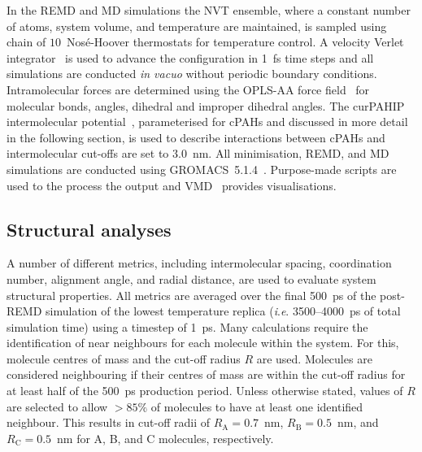 In the REMD and MD simulations the NVT ensemble, where a constant number of atoms, system volume, and temperature are maintained, is sampled using chain of $10$~Nos\'{e}-Hoover thermostats for temperature control. A velocity Verlet integrator~\cite{Verlet_1967} is used to advance the configuration in 1~fs time steps and all simulations are conducted \textit{in vacuo} without periodic boundary conditions.  Intramolecular forces are determined using the OPLS-AA force field~\cite{Kaminski2001opls} for molecular bonds, angles, dihedral and improper dihedral angles. The curPAHIP intermolecular potential~\cite{bowal2019ion}, parameterised for cPAHs and discussed in more detail in the following section, is used to describe interactions between cPAHs and intermolecular cut-offs are set to $3.0$~nm. All minimisation, REMD, and MD simulations are conducted using GROMACS~5.1.4~\cite{Abraham2015}. Purpose-made scripts are used to the process the output and VMD~\cite{Humphrey1996} provides visualisations.


\subsection{Structural analyses}
A number of different metrics, including intermolecular spacing, coordination number, alignment angle, and radial distance, are used to evaluate system structural properties. All metrics are averaged over the final 500~ps of the post-REMD simulation of the lowest temperature replica (\textit{i}.\textit{e}. 3500--4000~ps of total simulation time) using a timestep of 1~ps. 
Many calculations require the identification of near neighbours for each molecule within the system. For this, molecule centres of mass and the cut-off radius $R$ are used. Molecules are considered neighbouring if their centres of mass are within the cut-off radius for at least half of the 500~ps production period. Unless otherwise stated, values of $R$ are selected to allow $>85\%$ of molecules to have at least one identified neighbour. This results in cut-off radii of $R_{\text{A}} = 0.7$~nm, $R_{\text{B}} = 0.5$~nm, and $R_{\text{C}} = 0.5$~nm for A, B, and C molecules, respectively. 

